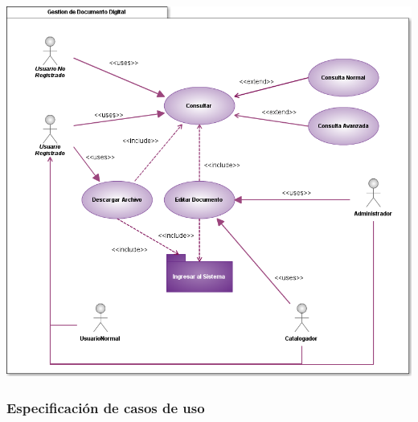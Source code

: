 \documentclass[11pt]{article}
\begin{document}
        \begin{minipage}[c]{1\linewidth}
                \begin{center}
                \includegraphics[scale=.5]{casosUso/CUGestionDocumento}
                \end{center}
        \end{minipage}
        
        
        \newpage                
                \subsubsection{Especificación de casos de uso}
                        
                        
                        
                        
                        
                        
                        
                        
                        
                        
\end{document}
